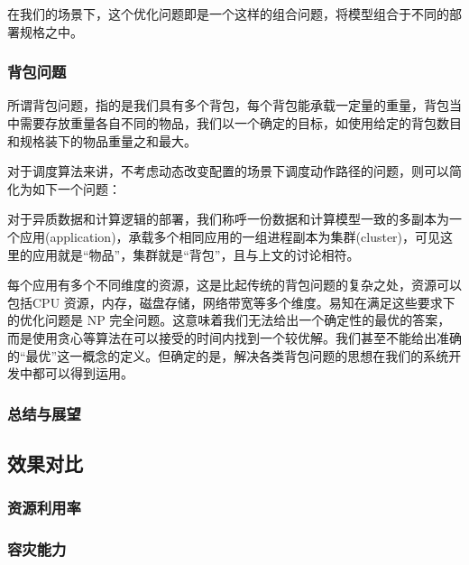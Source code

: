 在我们的场景下，这个优化问题即是一个这样的组合问题，将模型组合于不同的部署规格之中。

\subsubsection{背包问题}

所谓背包问题，指的是我们具有多个背包，每个背包能承载一定量的重量，背包当中需要存放重量各自不同的物品，我们以一个确定的目标，如使用给定的背包数目和规格装下的物品重量之和最大。

对于调度算法来讲，不考虑动态改变配置的场景下调度动作路径的问题，则可以简化为如下一个问题：

对于异质数据和计算逻辑的部署，我们称呼一份数据和计算模型一致的多副本为一个应用(application)，承载多个相同应用的一组进程副本为集群(cluster)，可见这里的应用就是“物品”，集群就是“背包”，且与上文的讨论相符。

每个应用有多个不同维度的资源，这是比起传统的背包问题的复杂之处，资源可以包括CPU 资源，内存，磁盘存储，网络带宽等多个维度。易知在满足这些要求下的优化问题是 NP 完全问题。这意味着我们无法给出一个确定性的最优的答案，而是使用贪心等算法在可以接受的时间内找到一个较优解。我们甚至不能给出准确的“最优”这一概念的定义。但确定的是，解决各类背包问题的思想在我们的系统开发中都可以得到运用。

\subsubsection{总结与展望}

\subsection{效果对比}

\subsubsection{资源利用率}

\subsubsection{容灾能力}

